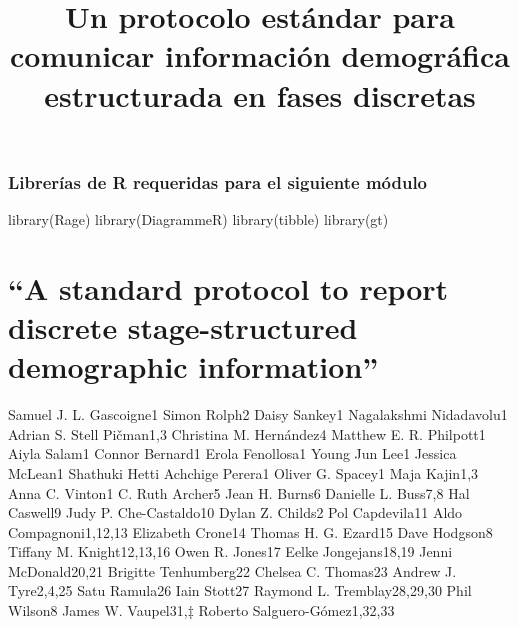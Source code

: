 \documentclass[
  12pt,
  letterpaper,
]{book}
\title{Un protocolo estándar para comunicar información demográfica
estructurada en fases discretas}
\author{}
\date{}
\newenvironment{Shaded}{\begin{snugshade}}{\end{snugshade}}
\newcommand{\FunctionTok}[1]{\textcolor[rgb]{0.28,0.35,0.67}{#1}}
\newcommand{\NormalTok}[1]{\textcolor[rgb]{0.00,0.23,0.31}{#1}}
\renewcommand*\contentsname{Table of contents}
\newcommand\contentsname{Table of contents}
\begin{document}
\frontmatter
\maketitle

\renewcommand*\contentsname{Table of contents}
{
\hypersetup{linkcolor=}
\setcounter{tocdepth}{2}
\tableofcontents
}

\mainmatter
\subsection{Librerías de R requeridas para el siguiente
módulo}\label{libreruxedas-de-r-requeridas-para-el-siguiente-muxf3dulo}

\begin{Shaded}
\begin{Highlighting}[]
\FunctionTok{library}\NormalTok{(Rage)}
\FunctionTok{library}\NormalTok{(DiagrammeR)}
\FunctionTok{library}\NormalTok{(tibble)}
\FunctionTok{library}\NormalTok{(gt)}
\end{Highlighting}
\end{Shaded}

\chapter{``A standard protocol to report discrete stage-structured
demographic
information''}\label{a-standard-protocol-to-report-discrete-stage-structured-demographic-information}

Samuel J. L. Gascoigne1 \textbar{} Simon Rolph2 \textbar{} Daisy Sankey1
\textbar{} Nagalakshmi Nidadavolu1 \textbar{} Adrian S. Stell Pičman1,3
\textbar{} Christina M. Hernández4 \textbar{} Matthew E. R. Philpott1
\textbar{} Aiyla Salam1 \textbar{} Connor Bernard1 \textbar{} Erola
Fenollosa1 \textbar{} Young Jun Lee1 \textbar{} Jessica McLean1
\textbar{} Shathuki Hetti Achchige Perera1 \textbar{} Oliver G. Spacey1
\textbar{} Maja Kajin1,3 \textbar{} Anna C. Vinton1 \textbar{} C. Ruth
Archer5 \textbar{} Jean H. Burns6 \textbar{} Danielle L. Buss7,8
\textbar{} Hal Caswell9 \textbar{} Judy P. Che-Castaldo10 \textbar{}
Dylan Z. Childs2 \textbar{} Pol Capdevila11 \textbar{} Aldo
Compagnoni1,12,13 \textbar{} Elizabeth Crone14 \textbar{} Thomas H. G.
Ezard15 \textbar{} Dave Hodgson8 \textbar{} Tiffany M. Knight12,13,16
\textbar{} Owen R. Jones17 \textbar{} Eelke Jongejans18,19 \textbar{}
Jenni McDonald20,21 \textbar{} Brigitte Tenhumberg22 \textbar{} Chelsea
C. Thomas23 \textbar{} Andrew J. Tyre2,4,25 \textbar{} Satu Ramula26
\textbar{} Iain Stott27 \textbar{} Raymond L. Tremblay28,29,30
\textbar{} Phil Wilson8 \textbar{} James W. Vaupel31,‡ \textbar{}
Roberto Salguero-Gómez1,32,33
\end{document}
